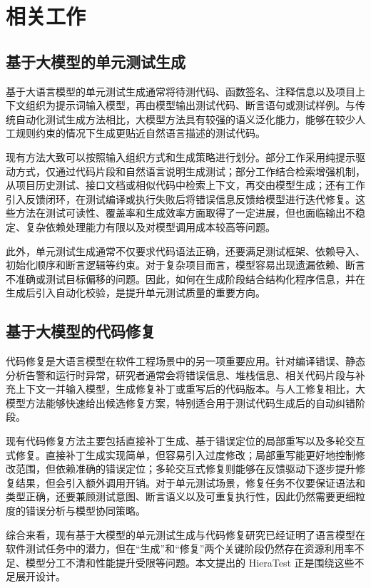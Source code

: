 \cleardoublepage

\section{相关工作}

\subsection{基于大模型的单元测试生成}

基于大语言模型的单元测试生成通常将待测代码、函数签名、注释信息以及项目上下文组织为提示词输入模型，再由模型输出测试代码、断言语句或测试样例。与传统自动化测试生成方法相比，大模型方法具有较强的语义泛化能力，能够在较少人工规则约束的情况下生成更贴近自然语言描述的测试代码。

现有方法大致可以按照输入组织方式和生成策略进行划分。部分工作采用纯提示驱动方式，仅通过代码片段和自然语言说明生成测试；部分工作结合检索增强机制，从项目历史测试、接口文档或相似代码中检索上下文，再交由模型生成；还有工作引入反馈闭环，在测试编译或执行失败后将错误信息反馈给模型进行迭代修复。这些方法在测试可读性、覆盖率和生成效率方面取得了一定进展，但也面临输出不稳定、复杂依赖处理能力有限以及对模型调用成本较高等问题。

此外，单元测试生成通常不仅要求代码语法正确，还要满足测试框架、依赖导入、初始化顺序和断言逻辑等约束。对于复杂项目而言，模型容易出现遗漏依赖、断言不准确或测试目标偏移的问题。因此，如何在生成阶段结合结构化程序信息，并在生成后引入自动化校验，是提升单元测试质量的重要方向。

\subsection{基于大模型的代码修复}

代码修复是大语言模型在软件工程场景中的另一项重要应用。针对编译错误、静态分析告警和运行时异常，研究者通常会将错误信息、堆栈信息、相关代码片段与补充上下文一并输入模型，生成修复补丁或重写后的代码版本。与人工修复相比，大模型方法能够快速给出候选修复方案，特别适合用于测试代码生成后的自动纠错阶段。

现有代码修复方法主要包括直接补丁生成、基于错误定位的局部重写以及多轮交互式修复。直接补丁生成实现简单，但容易引入过度修改；局部重写能更好地控制修改范围，但依赖准确的错误定位；多轮交互式修复则能够在反馈驱动下逐步提升修复结果，但会引入额外调用开销。对于单元测试场景，修复任务不仅要保证语法和类型正确，还要兼顾测试意图、断言语义以及可重复执行性，因此仍然需要更细粒度的错误分析与模型协同策略。

综合来看，现有基于大模型的单元测试生成与代码修复研究已经证明了语言模型在软件测试任务中的潜力，但在“生成”和“修复”两个关键阶段仍然存在资源利用率不足、模型分工不清和性能提升受限等问题。本文提出的 HieraTest 正是围绕这些不足展开设计。

